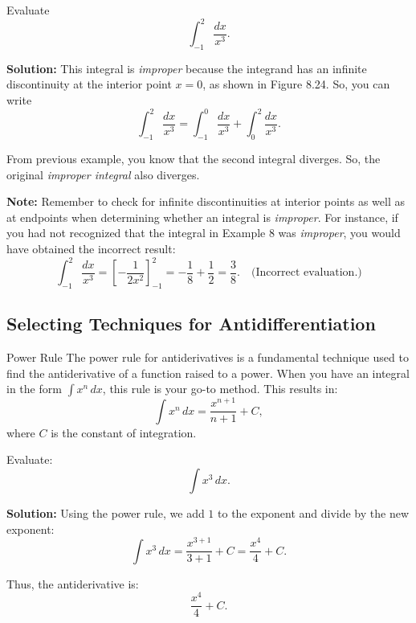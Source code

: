 \documentclass[12pt]{article}
\theoremstyle{beautifulthm}
\begin{document}
\begin{tcolorbox}[colback=examplebg, colframe=red!75!black, title=\textbf{EXAMPLE 4: An Improper Integral with an Interior Discontinuity}, fonttitle=\bfseries, sharp corners]
Evaluate
\[
\int_{-1}^2 \frac{dx}{x^3}.
\]


\tcblower
\textbf{Solution:} 
This integral is \textit{improper} because the integrand has an infinite discontinuity at the interior point $x = 0$, as shown in Figure 8.24. So, you can write
\[
\int_{-1}^2 \frac{dx}{x^3} = \int_{-1}^0 \frac{dx}{x^3} + \int_0^2 \frac{dx}{x^3}.
\]

From previous example, you know that the second integral diverges. So, the original \textit{improper integral} also diverges.

\textbf{Note:} Remember to check for infinite discontinuities at interior points as well as at endpoints when determining whether an integral is \textit{improper}. For instance, if you had not recognized that the integral in Example 8 was \textit{improper}, you would have obtained the incorrect result:
\[
\int_{-1}^2 \frac{dx}{x^3} = \left[ -\frac{1}{2x^2} \right]_{-1}^2 = -\frac{1}{8} + \frac{1}{2} = \frac{3}{8}. \quad \text{(Incorrect evaluation.)}
\]
\end{tcolorbox}



\newpage

\subsection{Selecting Techniques for Antidifferentiation}

\begin{mytheorem}{Power Rule}{}
    The power rule for antiderivatives is a fundamental technique used to find the antiderivative of a function raised to a power. When you have an integral in the form $\int x^n \, dx$, this rule is your go-to method.
\vspace{3mm}
This results in:
\[
\int x^n \, dx = \frac{x^{n+1}}{n+1} + C,
\]
where $C$ is the constant of integration.
\end{mytheorem}

\begin{tcolorbox}[colback=examplebg, colframe=red!75!black, title=\textbf{EXAMPLE 1: Find the Integral of the Function}, fonttitle=\bfseries, sharp corners]
Evaluate:
\[
\int x^3 \, dx.
\]


\tcblower
\textbf{Solution:} 
Using the power rule, we add $1$ to the exponent and divide by the new exponent:
\[
\int x^3 \, dx = \frac{x^{3+1}}{3+1} + C = \frac{x^4}{4} + C.
\]

Thus, the antiderivative is:
\[
\frac{x^4}{4} + C.
\]

\end{tcolorbox}
\end{document}
